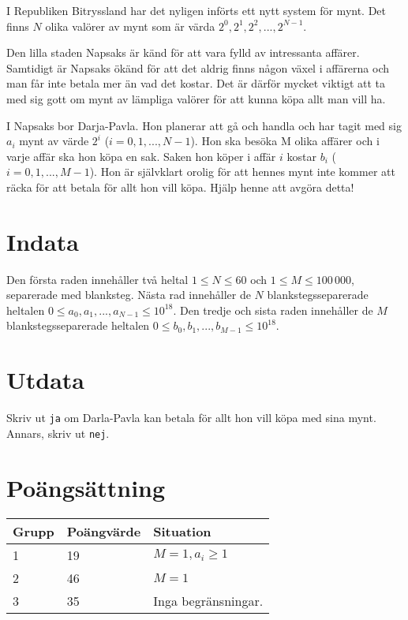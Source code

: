 I Republiken Bitryssland har det nyligen införts ett nytt system för mynt.
Det finns $N$ olika valörer av mynt som är värda $2^0, 2^1, 2^2, ..., 2^{N-1}$. 

Den lilla staden Napsaks är känd för att vara fylld av intressanta affärer.
Samtidigt är Napsaks ökänd för att det aldrig finns någon växel i affärerna och man får inte betala mer än vad det kostar.
Det är därför mycket viktigt att ta med sig gott om mynt av lämpliga valörer för att kunna köpa allt man vill ha. 

I Napsaks bor Darja-Pavla.
Hon planerar att gå och handla och har tagit med sig $a_i$ mynt av värde $2^i$ ($i = 0, 1, ..., N-1$).
Hon ska besöka M olika affärer och i varje affär ska hon köpa en sak.
Saken hon köper i affär $i$ kostar $b_i$ ($i = 0, 1, ..., M-1$).
Hon är självklart orolig för att hennes mynt inte kommer att räcka för att betala för allt hon vill köpa. Hjälp henne att avgöra detta!

\section*{Indata}
Den första raden innehåller två heltal $1 \le N \le 60$ och $1 \le M \le 100\,000$, separerade med blanksteg.
Nästa rad innehåller de $N$ blankstegsseparerade heltalen $0 \le a_0, a_1, ..., a_{N-1} \le 10^{18}$.
Den tredje och sista raden innehåller de $M$ blankstegsseparerade heltalen $0 \le b_0, b_1, ..., b_{M-1} \le 10^{18}$.

\section*{Utdata}
Skriv ut \texttt{ja} om Darla-Pavla kan betala för allt hon vill köpa med sina mynt.
Annars, skriv ut \texttt{nej}.

\section*{Poängsättning}
\begin{tabular}{| l | l | l |}
\hline
Grupp & Poängvärde & Situation \\ \hline
1     & 19         & $M = 1, a_i \ge 1$ \\ \hline
2     & 46         & $M = 1$ \\ \hline
3     & 35         & Inga begränsningar. \\ \hline
\end{tabular}
